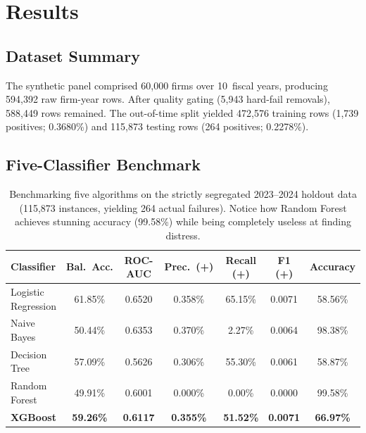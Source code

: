 \documentclass[sigconf,anonymous]{acmart}
\begin{document}
\section{Results}

\subsection{Dataset Summary}
The synthetic panel comprised 60,000 firms over 10~fiscal years, producing 594,392 raw firm-year rows. After quality gating (5,943 hard-fail removals), 588,449 rows remained. The out-of-time split yielded 472,576 training rows (1,739 positives; 0.3680\%) and 115,873 testing rows (264 positives; 0.2278\%).

\subsection{Five-Classifier Benchmark}

\begin{table}[htbp]
\caption{Benchmarking five algorithms on the strictly segregated 2023--2024 holdout data (115,873 instances, yielding 264 actual failures). Notice how Random Forest achieves stunning accuracy (99.58\%) while being completely useless at finding distress.}
\begin{center}
\begin{tabular}{lcccccc}
\toprule
\textbf{Classifier} & \textbf{Bal.\ Acc.} & \textbf{ROC-AUC} & \textbf{Prec.\ (+)} & \textbf{Recall (+)} & \textbf{F1 (+)} & \textbf{Accuracy} \\
\midrule
Logistic Regression & 61.85\% & 0.6520 & 0.358\% & 65.15\% & 0.0071 & 58.56\% \\
Naive Bayes & 50.44\% & 0.6353 & 0.370\% & 2.27\% & 0.0064 & 98.38\% \\
Decision Tree & 57.09\% & 0.5626 & 0.306\% & 55.30\% & 0.0061 & 58.87\% \\
Random Forest & 49.91\% & 0.6001 & 0.000\% & 0.00\% & 0.0000 & 99.58\% \\
\textbf{XGBoost} & \textbf{59.26\%} & \textbf{0.6117} & \textbf{0.355\%} & \textbf{51.52\%} & \textbf{0.0071} & \textbf{66.97\%} \\
\bottomrule
\end{tabular}
\label{tab_benchmark}
\end{center}
\end{table}
\end{document}
